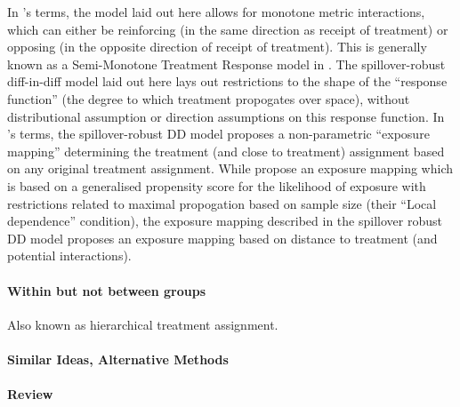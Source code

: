 \documentclass[12pt]{article}
\begin{document}
\begin{spacing}{1.3}
In \citet{Manski2013}'s terms, the model laid out here allows for
monotone metric interactions, which can either be reinforcing (in the
same direction as receipt of treatment) or opposing (in the opposite
direction of receipt of treatment).  This is generally known as a
Semi-Monotone Treatment Response model in \citet{Manski2013}. The
spillover-robust diff-in-diff model laid out here lays out restrictions
to the shape of the ``response function'' (the degree to which treatment
propogates over space), without distributional assumption or direction
assumptions on this response function.  In \citet{AronowSamii2017}'s
terms, the spillover-robust DD model proposes a non-parametric ``exposure
mapping'' determining the treatment (and close to treatment) assignment
based on any original treatment assignment.  While \citet{AronowSamii2017}
propose an exposure mapping which is based on a generalised propensity
score for the likelihood of exposure with restrictions related to maximal
propogation based on sample size (their ``Local dependence'' condition),
the exposure mapping described in the spillover robust DD model proposes
an exposure mapping based on distance to treatment (and potential interactions).

%
%

\paragraph{Within but not between groups} \citet{HudgensHalloran2008,LiuHudgens2014}
Also known as hierarchical treatment assignment.

\paragraph{Similar Ideas, Alternative Methods} \citet{Rosenbaum2007}

\paragraph{Review} \citet{TchetgenTchetgenVanderWeele2012,
  AngelucciDiMaro2010,Blumeetal2011}


\end{spacing}
\end{document}
